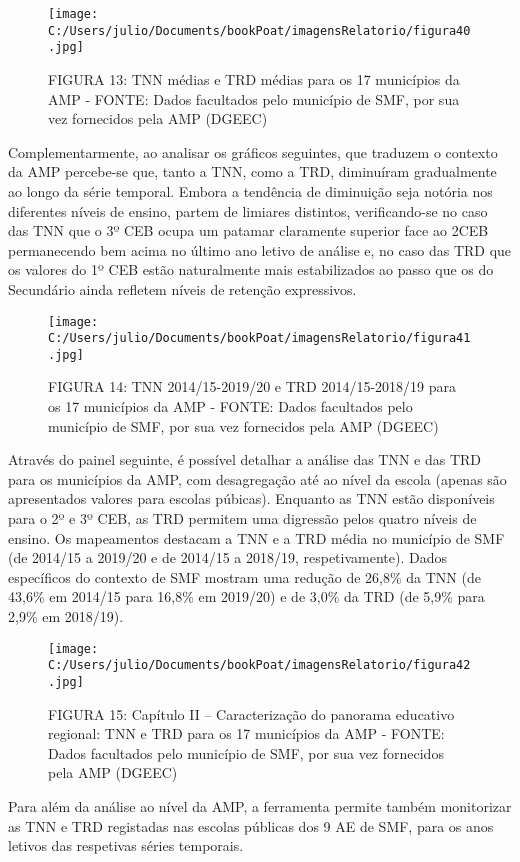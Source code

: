 \documentclass[
]{book}
\begin{document}
\begin{figure}
\centering
\texttt{[image: C:/Users/julio/Documents/bookPoat/imagensRelatorio/figura40.jpg]}
\caption{FIGURA 13: TNN médias e TRD médias para os 17 municípios da AMP - FONTE: Dados facultados pelo município de SMF, por sua vez fornecidos pela AMP (DGEEC)}
\end{figure}

Complementarmente, ao analisar os gráficos seguintes, que traduzem o contexto da AMP percebe-se que, tanto a TNN, como a TRD, diminuíram gradualmente ao longo da série temporal. Embora a tendência de diminuição seja notória nos diferentes níveis de ensino, partem de limiares distintos, verificando-se no caso das TNN que o 3º CEB ocupa um patamar claramente superior face ao 2CEB permanecendo bem acima no último ano letivo de análise e, no caso das TRD que os valores do 1º CEB estão naturalmente mais estabilizados ao passo que os do Secundário ainda refletem níveis de retenção expressivos.

\begin{figure}
\centering
\texttt{[image: C:/Users/julio/Documents/bookPoat/imagensRelatorio/figura41.jpg]}
\caption{FIGURA 14: TNN 2014/15-2019/20 e TRD 2014/15-2018/19 para os 17 municípios da AMP - FONTE: Dados facultados pelo município de SMF, por sua vez fornecidos pela AMP (DGEEC)}
\end{figure}

Através do painel seguinte, é possível detalhar a análise das TNN e das TRD para os municípios da AMP, com desagregação até ao nível da escola (apenas são apresentados valores para escolas púbicas). Enquanto as TNN estão disponíveis para o 2º e 3º CEB, as TRD permitem uma digressão pelos quatro níveis de ensino. Os mapeamentos destacam a TNN e a TRD média no município de SMF (de 2014/15 a 2019/20 e de 2014/15 a 2018/19, respetivamente). Dados específicos do contexto de SMF mostram uma redução de 26,8\% da TNN (de 43,6\% em 2014/15 para 16,8\% em 2019/20) e de 3,0\% da TRD (de 5,9\% para 2,9\% em 2018/19).

\begin{figure}
\centering
\texttt{[image: C:/Users/julio/Documents/bookPoat/imagensRelatorio/figura42.jpg]}
\caption{FIGURA 15: Capítulo II -- Caracterização do panorama educativo regional: TNN e TRD para os 17 municípios da AMP - FONTE: Dados facultados pelo município de SMF, por sua vez fornecidos pela AMP (DGEEC)}
\end{figure}

Para além da análise ao nível da AMP, a ferramenta permite também monitorizar as TNN e TRD registadas nas escolas públicas dos 9 AE de SMF, para os anos letivos das respetivas séries temporais.
\end{document}
